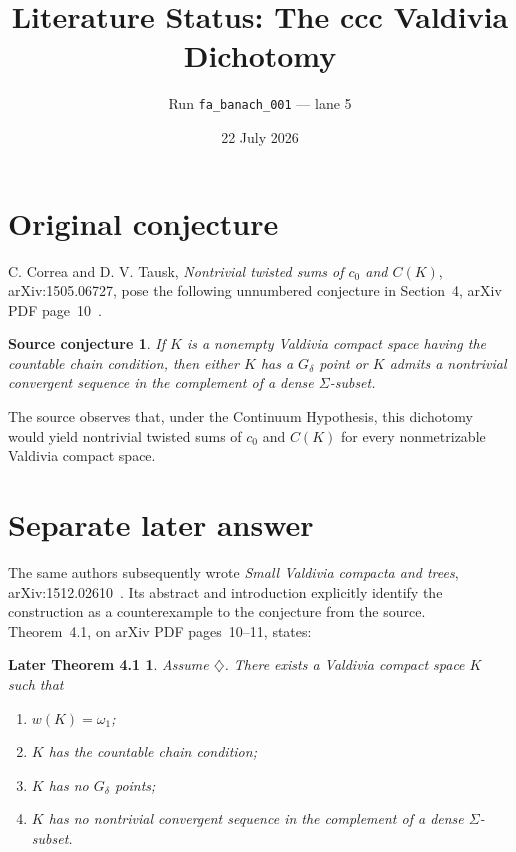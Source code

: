 \documentclass[11pt]{article}
\title{Literature Status: The ccc Valdivia Dichotomy}
\author{Run \texttt{fa\_banach\_001} --- lane 5}
\date{22 July 2026}
\newtheorem*{conjecture}{Source conjecture}
\newtheorem*{answer}{Later Theorem 4.1}
\begin{document}
\maketitle

\begin{center}
\end{center}

\section{Original conjecture}

C. Correa and D. V. Tausk, \emph{Nontrivial twisted sums of $c_0$ and
$C(K)$}, arXiv:1505.06727, pose the following unnumbered conjecture in
Section~4, arXiv PDF page~10~\cite{source}.

\begin{conjecture}
If $K$ is a nonempty Valdivia compact space having the countable chain
condition, then either $K$ has a $G_\delta$ point or $K$ admits a
nontrivial convergent sequence in the complement of a dense
$\Sigma$-subset.
\end{conjecture}

The source observes that, under the Continuum Hypothesis, this dichotomy
would yield nontrivial twisted sums of $c_0$ and $C(K)$ for every
nonmetrizable Valdivia compact space.

\section{Separate later answer}

The same authors subsequently wrote \emph{Small Valdivia compacta and
trees}, arXiv:1512.02610~\cite{answerpaper}. Its abstract and introduction
explicitly identify the construction as a counterexample to the conjecture
from the source. Theorem~4.1, on arXiv PDF pages~10--11, states:

\begin{answer}
Assume $\diamondsuit$. There exists a Valdivia compact space $K$ such that
\begin{enumerate}
\item $w(K)=\omega_1$;
\item $K$ has the countable chain condition;
\item $K$ has no $G_\delta$ points;
\item $K$ has no nontrivial convergent sequence in the complement of a
dense $\Sigma$-subset.
\end{enumerate}
\end{answer}
\end{document}
